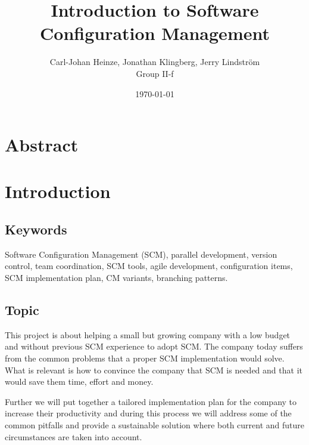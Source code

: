 \documentclass[10pt]{article}
\begin{document}
\makeatletter
\renewcommand{\@biblabel}[1]{\quad#1.}
\makeatother


\pagestyle{myheadings}



\begin{titlepage}
\title{Introduction to Software Configuration Management}
\author{Carl-Johan Heinze, Jonathan Klingberg, Jerry Lindström \\Group II-f}
\date{\today}
\maketitle
\thispagestyle{empty}
\end{titlepage}

\tableofcontents
\thispagestyle{empty}
\newpage
{}

\section{Abstract}

\section{Introduction}
\subsection{Keywords}
Software Configuration Management (SCM), parallel development, version control, team coordination, SCM tools, agile development, configuration items, SCM implementation plan, CM variants, branching patterns.

\subsection{Topic}
This project is about helping a small but growing company with a low budget and without previous SCM experience to adopt SCM. The company today suffers from the common problems that a proper SCM implementation would solve. What is relevant is how to convince the company that SCM is needed and that it would save them time, effort and money. 

\noindent Further we will put together a tailored implementation plan for the company to increase their productivity and during this process we will address some of the common pitfalls and provide a sustainable solution where both current and future circumstances are taken into account.
\end{document}
